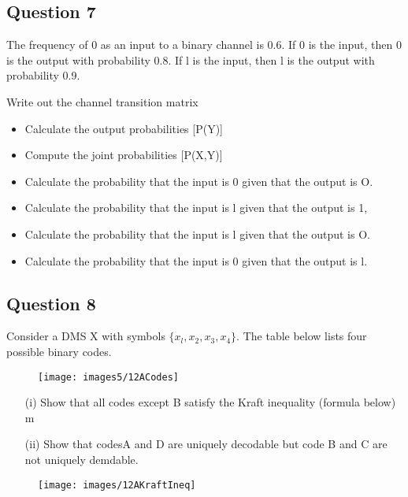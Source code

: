 \documentclass[a4paper,12pt]{article}
\begin{document}
\subsection*{Question 7}

The frequency of 0 as an input to a binary channel is 0.6. If 0 is the input, then 0 is the output with probability 0.8. If l is the input, then l is the output with probability 0.9.

Write out the channel transition matrix

\begin{itemize}
\item	Calculate the output probabilities [P(Y)] 
\item	Compute the joint probabilities [P(X,Y)]
\item	Calculate the probability that the input is 0 given that the output is O. 
\item Calculate the probability that the input is l given that the output is 1, 
\item	Calculate the probability that the input is l given that the output is O.
\item	Calculate the probability that the input is 0 given that the output is l. 
\end{itemize}


\subsection*{Question 8 }
Consider a DMS X with symbols $\{x_l,x_2,x_3,x_4\}$. The table below lists four possible
binary codes.

\begin{figure}[h!]
\centering
\texttt{[image: images5/12ACodes]}
\caption{}
\label{fig:12ACodes}
\end{figure}



\begin{itemize}
\item[(i)] Show that all codes except B satisfy the Kraft inequality (formula below)
m
\item[(ii)] Show that codesA and D are uniquely decodable but code B and C are not
uniquely demdable.
\end{itemize}
\begin{figure}[h!]
\centering
\texttt{[image: images/12AKraftIneq]}
\caption{}
\label{fig:12AKraftIneq}
\end{figure}
\end{document}
